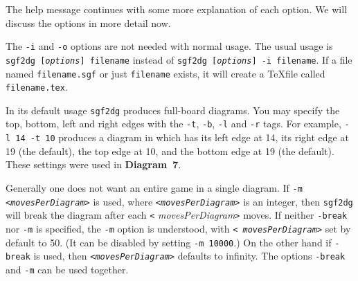 % 
\bigbreak
The help message continues with some more explanation of each option.
We will discuss the options in more detail now.

The {\tt -i} and {\tt -o} options are not needed with normal usage.
The usual usage is {\tt sgf2dg {\rm [{\it options}]} filename} instead of
{\tt sgf2dg {\rm [{\it options}]} -i filename}. If
a file named {\tt filename.sgf} or just {\tt filename} exists, it
will create a \TeX file called {\tt filename.tex}. 

In its default usage {\tt sgf2dg} produces full-board diagrams.
You may specify the top, bottom, left and right edges with the
{\tt -t}, {\tt -b}, {\tt -l} and {\tt -r} tags. For example,
{\tt \hbox{-l 14} \hbox{-t 10}} produces a diagram in which
has its left edge at 14, its right edge at 19 (the default),
the top edge at 10, and the bottom edge at 19 (the default).
These settings were used in {\bf Diagram~7}.

Generally one does not want an entire game in a single diagram.  If {\tt -m}
{\tt<{\it movesPerDiagram\/}>} is used, where 
{\tt<{\it movesPerDiagram\/}>} is an integer, then
{\tt sgf2dg} will break the diagram after each {\tt<}{\it
movesPerDiagram\/}{\tt>} moves. If neither {\tt -break} nor {\tt -m} is
specified, the {\tt -m} option is understood, with {\tt<{\it
movesPerDiagram\/}>} set by default to 50. (It can be disabled by setting
{\tt -m 10000}.) On the other hand if {\tt -break} is used, then 
{\tt<{\it movesPerDiagram\/}>} defaults to infinity. The options 
{\tt -break} and {\tt -m} can be used together.

